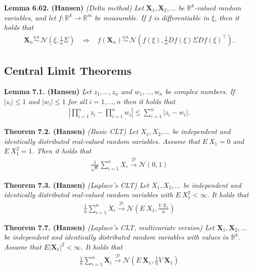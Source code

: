 \documentclass[a4paper,12pt,openany]{book}
\begin{document}
\textbf{Lemma 6.62. (Hansen)} \emph{(Delta method) Let \(\mathbf{X}_1,\mathbf{X}_2,...\) be \(\mathbb{R}^k\)-valued random variables, and let \(f : \mathbb{R}^k\to \mathbb{R}^m\) be measurable. If \(f\) is differentiable in \(\xi\), then it holds that}
\begin{align*}
    \mathbf{X}_n\stackrel{\text{a.s.}}{\sim} \mathcal{N}\left(\xi,\frac{1}{n}\Sigma\right)\hspace{10pt}\Rightarrow\hspace{10pt} f(\mathbf{X}_n)\stackrel{\text{a.s.}}{\sim} \mathcal{N}\left(f(\xi),\frac{1}{n}Df(\xi)\Sigma Df(\xi)^\top\right).
\end{align*}

\hypertarget{central-limit-theorems}{%
\subsection{Central Limit Theorems}\label{central-limit-theorems}}

\textbf{Lemma 7.1. (Hansen)} \emph{Let \(z_1,...,z_n\) and \(w_1,...,w_n\) be complex numbers. If \(\vert z_i\vert \le 1\) and \(\vert w_i\vert\le 1\) for all \(i=1,...,n\) then it holds that}
\begin{align*}
    \left\vert\prod_{i=1}^n z_i-\prod_{i=1}^n w_i\right\vert\le \sum_{i=1}^n \vert z_i-w_i\vert.\tag{7.1 }
\end{align*}

\textbf{Theorem 7.2. (Hansen)} \emph{(Basic CLT) Let \(X_1,X_2,...\) be independent and identically distributed real-valued random variables. Assume that \(E\ X_1=0\) and \(E\ X_1^2=1\). Then it holds that}
\begin{align*}
    \frac{1}{\sqrt{n}}\sum_{i=1}^nX_i\stackrel{\mathcal{D}}{\to} \mathcal{N}(0,1)\tag{7.3}
\end{align*}

\textbf{Theorem 7.3. (Hansen)} \emph{(Laplace's CLT) Let \(X_1,X_2,...\) be independent and identically distributed real-valued random variables with \(E\ X_1^2<\infty\). It holds that}
\begin{align*}
    \frac{1}{n}\sum_{i=1}^nX_i\stackrel{\mathcal{D}}{\to} \mathcal{N}\left(E\ X_1,\frac{V\ X_1}{n}\right)\tag{7.4}
\end{align*}

\textbf{Theorem 7.7. (Hansen)} \emph{(Laplace's CLT, multivariate version) Let \(\mathbf{X}_1,\mathbf{X}_2,...\) be independent and identically distributed random variables with values in \(\mathbb{R}^k\). Assume that \(E\vert \mathbf{X}_1\vert^2<\infty\). It holds that}
\begin{align*}
    \frac{1}{n}\sum_{i=1}^n\mathbf{X}_i\stackrel{\mathcal{D}}{\to} \mathcal{N}\left(E\ \mathbf{X}_1,\frac{1}{n}V\ \mathbf{X}_1\right)\tag{7.7}
\end{align*}
\end{document}
